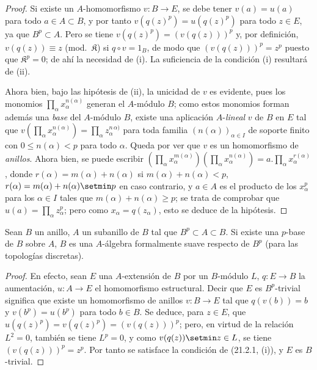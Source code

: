\begin{proof}
Si existe un $A$-homomorfismo $v:B\to E$, se debe tener $v(a)=u(a)$ para
todo $a\in A\subset B$, y por tanto $v(q(z)^p)=u(q(z)^p)$ para todo $z\in E$,
ya que $B^p\subset A$. Pero se tiene $v(q(z)^p)=(v(q(z)))^p$ y, por definición,
$v(q(z))\equiv z$ (mod.~$\mathfrak K$) si $q\circ v=1_B$, de modo que
$(v(q(z)))^p=z^p$ puesto que $\mathfrak K^p=0$; de ahí la necesidad de (i).
La suficiencia de la condición (i) resultará de (ii).

Ahora bien, bajo las hipótesis de (ii), la unicidad de $v$ es evidente, pues
los monomios $\prod_\alpha x_\alpha^{n(\alpha)}$ generan el $A$-módulo $B$;
como estos monomios forman además una \emph{base} del $A$-módulo $B$, existe
una aplicación $A$-\emph{lineal} $v$ de $B$ en $E$ tal que
$v(\prod_\alpha x_\alpha^{n(\alpha)})=\prod_\alpha z_\alpha^{n\,\alpha)}$
para toda familia $(n(\alpha))_{\alpha\in I}$ de soporte finito con
$0\leq n(\alpha)<p$ para todo $\alpha$. Queda por ver que $v$ es un
homomorfismo de \emph{anillos}. Ahora bien, se puede escribir
$(\prod_\alpha x_\alpha^{m(\alpha)})(\prod_\alpha x_\alpha^{n(\alpha)})
=a.\prod_\alpha x_\alpha^{r(\alpha)}$, donde
$r(\alpha)=m(\alpha)+n(\alpha)$ si $m(\alpha)+n(\alpha)<p$,
$r(\alpha)=m(\alpha)+n(\alpha)\setmin p$ en caso contrario, y $a\in A$
es el producto de los $x_\alpha^p$ para los $\alpha\in I$ tales que
$m(\alpha)+n(\alpha)\geq p$; se trata de comprobar que
$u(a)=\prod_\alpha z_\alpha^p$; pero como $x_\alpha=q(z_\alpha)$, esto se
deduce de la hipótesis.
\end{proof}

\begin{corollary}[21.2.2]
\label{0.21.2.2-fr}
Sean $B$ un anillo, $A$ un subanillo de $B$ tal que $B^p\subset A\subset B$.
Si existe una $p$-base de $B$ sobre $A$, $B$ es una $A$-álgebra formalmente
suave respecto de $B^p$ (para las topologías discretas).
\end{corollary}

\begin{proof}
En efecto, sean $E$ una $A$-extensión de $B$ por un $B$-módulo $L$, $q:E\to B$ la
aumentación, $u:A\to E$ el homomorfismo estructural. Decir que $E$ es
$B^p$-trivial significa que existe un homomorfismo de anillos $v:B\to E$
tal que $q(v(b))=b$ y $v(b^p)=u(b^p)$ para todo $b\in B$. Se deduce, para
$z\in E$, que $u(q(z)^p)=v(q(z)^p)=(v(q(z)))^p$; pero, en virtud de la
relación $L^2=0$, también se tiene $L^p=0$, y como $v(q(z))\setmin z\in L$, se
tiene $(v(q(z)))^p=z^p$. Por tanto se satisface la condición de (21.2.1, (i)), y $E$ es $B$-trivial.
\end{proof}

